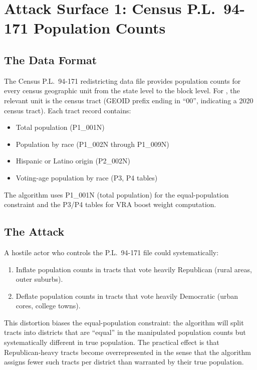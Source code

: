\section{Attack Surface 1: Census P.L.\ 94-171 Population Counts}
\label{sec:pl94}

\subsection{The Data Format}

The Census P.L.\ 94-171 redistricting data file provides population counts
for every census geographic unit from the state level to the block level.
For \bisect{}, the relevant unit is the census tract (GEOID prefix ending
in ``00'', indicating a 2020 census tract).
Each tract record contains:
\begin{itemize}
\item Total population (P1\_001N)
\item Population by race (P1\_002N through P1\_009N)
\item Hispanic or Latino origin (P2\_002N)
\item Voting-age population by race (P3, P4 tables)
\end{itemize}

The algorithm uses P1\_001N (total population) for the equal-population
constraint and the P3/P4 tables for VRA boost weight computation.

\subsection{The Attack}

A hostile actor who controls the P.L.\ 94-171 file could systematically:
\begin{enumerate}
\item Inflate population counts in tracts that vote heavily Republican
  (rural areas, outer suburbs).
\item Deflate population counts in tracts that vote heavily Democratic
  (urban cores, college towns).
\end{enumerate}

This distortion biases the equal-population constraint: the algorithm
will split tracts into districts that are ``equal'' in the manipulated
population counts but systematically different in true population.
The practical effect is that Republican-heavy tracts become overrepresented
in the sense that the algorithm assigns fewer such tracts per district
than warranted by their true population.

